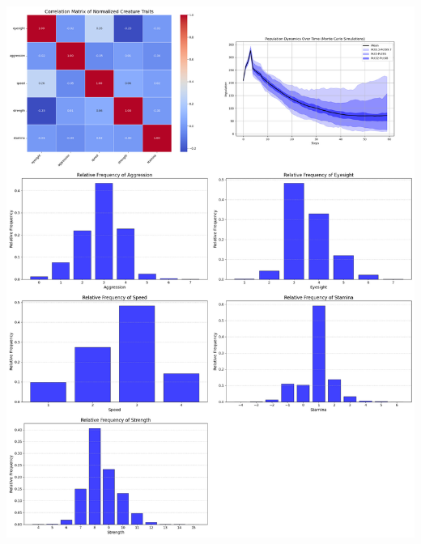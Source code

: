 \documentclass{article}
\begin{document}
\begin{center}
    \includegraphics[scale=0.21]{tests/1.6.jpg}
\end{center}
\end{document}
